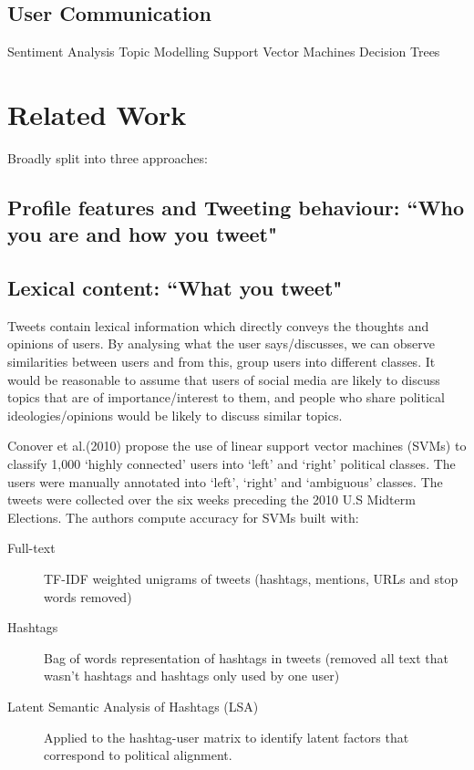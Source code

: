 \documentclass[bsc,frontabs,singlespacing,parskip]{infthesis}     %
\begin{document}
\section{User Communication}

Sentiment Analysis 
Topic Modelling
Support Vector Machines
Decision Trees

\chapter{Related Work}

Broadly split into three approaches:

\section{Profile features and Tweeting behaviour: ``Who you are and how you tweet"}

\section{Lexical content: ``What you tweet"}
\label{sec:lingcont}

Tweets contain lexical information which directly conveys the thoughts and opinions of users. By analysing what the user says/discusses, we can observe similarities between users and from this, group users into different classes. It would be reasonable to assume that users of social media are likely to discuss topics that are of importance/interest to them, and people who share political ideologies/opinions would be likely to discuss similar topics. 

Conover et al.(2010) \cite{Conover2010predicting} propose the use of linear support vector machines (SVMs) to classify 1,000 `highly connected' users into `left' and `right' political classes. The users were manually annotated into `left', `right' and `ambiguous' classes. The tweets were collected over the six weeks preceding the 2010 U.S Midterm Elections. The authors compute accuracy for SVMs built with:
\begin{description}
\item[Full-text] TF-IDF weighted unigrams of tweets (hashtags, mentions, URLs and stop words removed)
\item[Hashtags] Bag of words representation of hashtags in tweets (removed all text that wasn't hashtags and hashtags only used by one user)
\item[Latent Semantic Analysis of Hashtags (LSA)] Applied to the hashtag-user matrix to identify latent factors that correspond to political alignment. 
\end{description}
\end{document}
